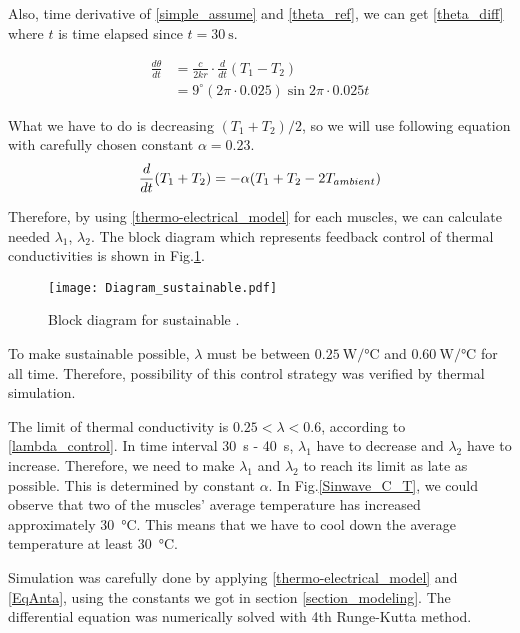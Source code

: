 Also, time derivative of \eqref{simple_assume} and \eqref{theta_ref}, we can get \eqref{theta_diff} where $t$ is time elapsed since $t=\SI{30}{\second}$.

\begin{equation} \label{theta_diff}
\begin{aligned} 
\frac{d\theta}{dt} & = \frac{c}{2kr}\cdot\frac{d}{dt}(T_{1}-T_{2}) \\
& = 9^{\circ}(2\pi\cdot 0.025)\sin{2\pi\cdot 0.025t} 
\end{aligned}
\end{equation}


What we have to do is decreasing $(T_{1}+T_{2})/2$, so we will use following equation with carefully chosen constant $\alpha = 0.23$. 
\begin{equation}
\frac{d}{dt}(T_{1}+T_{2}) = -\alpha(T_{1}+T_{2}-2T_{ambient}) \notag
\end{equation}

Therefore, by using \eqref{thermo-electrical_model} for each muscles, we can calculate needed $\lambda_{1}$, $\lambda_{2}$. The block diagram which represents feedback control of thermal conductivities is shown in Fig.\ref{diagram_sustainable}.

\begin{figure}[t]
	\centering\texttt{[image: Diagram\_sustainable.pdf]}
	\caption{Block diagram for sustainable \apcnospace.}
	\label{diagram_sustainable}
\end{figure}

To make sustainable \apc possible, $\lambda$ must be between $\SI{0.25}{\watt\per\degreeCelsius}$ and $\SI{0.60}{\watt\per\degreeCelsius}$ for all time. Therefore, possibility of this control strategy was verified by thermal simulation.

The limit of thermal conductivity is $0.25<\lambda<0.6$, according to \eqref{lambda_control}. In time interval \SI{30}{\second} - \SI{40}{\second}, $\lambda_{1}$ have to decrease and $\lambda_{2}$ have to increase. Therefore, we need to make $\lambda_{1}$ and $\lambda_{2}$ to reach its limit as late as possible. This is determined by constant $\alpha$. 
In Fig.\ref{Sinwave_C_T}, we could observe that two of the muscles' average temperature has increased approximately  \SI{30}{\degreeCelsius}. This means that we have to cool down the average temperature at least \SI{30}{\degreeCelsius}. 

Simulation was carefully done by applying \eqref{thermo-electrical_model} and \eqref{EqAnta}, using the constants we got in section \ref{section_modeling}. The differential equation was numerically solved with 4th Runge-Kutta method.

